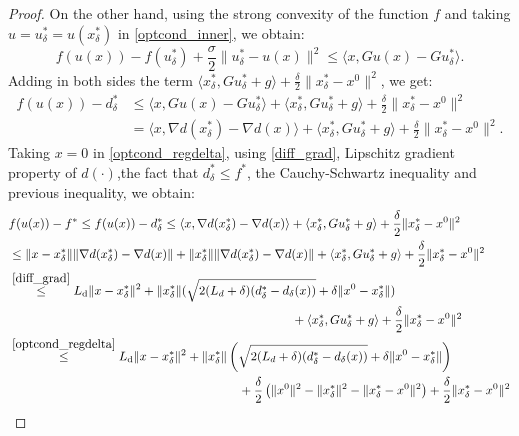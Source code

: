 \documentclass{gOMS2e}
\theoremstyle{plain}
\theoremstyle{definition}
\theoremstyle{remark}
\providecommand{\norm}[1]{\lVert#1\rVert}
\begin{document}
\begin{proof}
\noindent On the other hand, using the strong convexity of the
function $f$ and taking $u = u^*_{\delta} = u(x^*_{\delta})$ in
\eqref{optcond_inner}, we obtain:
\begin{equation*}
f(u(x)) - f(u^*_{\delta}) + \frac{\sigma}{2}\norm{u^*_{\delta} -
u(x)}^2 \le \langle x, G u(x) - G u^*_{\delta}\rangle.
\end{equation*}
Adding in both sides the term $\langle x^*_{\delta}, G u^*_{\delta}
+ g\rangle + \frac{\delta}{2}\norm{x^*_{\delta}-x^0}^2$, we get:
\begin{align*}
f(u(x)) - d^*_{\delta}
&\le \langle x, G u(x) - G u^*_{\delta}\rangle + \langle x^*_{\delta}, G u^*_{\delta} + g\rangle + \frac{\delta}{2}\norm{x^*_{\delta}-x^0}^2\\
& = \langle x, \nabla d(x^*_{\delta}) - \nabla d(x) \rangle +
\langle x^*_{\delta}, G u^*_{\delta} + g\rangle +
\frac{\delta}{2}\norm{x^*_{\delta}-x^0}^2.
\end{align*}
Taking $x = 0$ in \eqref{optcond_regdelta}, using \eqref{diff_grad},
Lipschitz gradient property of $d(\cdot)$,the fact that
$d_{\delta}^* \le f^*$, the Cauchy-Schwartz inequality and previous
inequality, we obtain:
\begin{align*}
&f(u(x)) - f^* \le f(u(x)) - d^*_{\delta}
\le \langle x, \nabla d(x^*_{\delta}) - \nabla d(x) \rangle + \langle x^*_{\delta}, G u^*_{\delta} + g\rangle + \frac{\delta}{2}\norm{x^*_{\delta}-x^0}^2\\
&\le \norm{x -x^*_{\delta}} \norm{ \nabla d(x^*_{\delta}) - \nabla
d(x)} + \norm{x^*_{\delta}} \norm{ \nabla d(x^*_{\delta}) - \nabla
d(x)} +
\langle x^*_{\delta}, G u^*_{\delta} + g\rangle + \frac{\delta}{2}\norm{x^*_{\delta}-x^0}^2\\
& \overset{\eqref{diff_grad}}{\le} L_{\text{d}}\norm{x -x^*_{\delta}}^2  + \norm{x^*_{\delta}}(\sqrt{2(L_{d}+\delta)(d^*_{\delta} - d_{\delta}(x))} + \delta\norm{x^0-x^*_{\delta}}) \\
& \hspace{8cm} + \langle x^*_{\delta}, G u^*_{\delta} + g\rangle + \frac{\delta}{2}\norm{x^*_{\delta}-x^0}^2\\
& \overset{\eqref{optcond_regdelta}}{\le} L_{\text{d}}\norm{x
-x^*_{\delta}}^2 + \norm{x^*_{\delta}}
\left(\sqrt{2(L_{d}+\delta)(d^*_{\delta} - d_{\delta}(x))} +
\delta\norm{x^0-x^*_{\delta}}\right) \\
& \hspace{6.5cm} + \frac{\delta}{2}\left( \norm{x^0}^2 - \norm{x^*_{\delta}}^2 - \norm{x^*_{\delta} - x^0}^2 \right) + \frac{\delta}{2}\norm{x^*_{\delta}-x^0}^2\\

\end{align*}
\end{proof}
\end{document}
